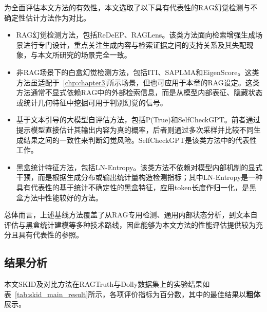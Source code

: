 为全面评估本文方法的有效性，本文选取了以下具有代表性的RAG幻觉检测与不确定性估计方法作为对比。

\begin{itemize}
  \item RAG幻觉检测方法，包括ReDeEP\cite{sun2025redeep}、RAGLens\cite{xiong2025toward}。该类方法面向检索增强生成场景进行专门设计，重点关注生成内容与检索证据之间的支持关系及其失配现象，与本文所研究的场景完全一致。
  \item 非RAG场景下的白盒幻觉检测方法，包括ITI\cite{li2023inference}、SAPLMA\cite{azaria2023internal}和EigenScore\cite{chen2024inside}。这类方法虽适配于~\ref{chp:chapter3}所示场景，但也可应用于本章的RAG设定。这类方法通常不显式依赖RAG中的外部检索信息，而是从模型内部表征、隐藏状态或统计几何特征中挖掘可用于判别幻觉的信号。
  \item 基于文本引导的大模型自评估方法，包括P(True)\cite{kadavath2022language}和SelfCheckGPT\cite{manakul2023selfcheckgpt}。前者通过提示模型直接估计其输出内容为真的概率，后者则通过多次采样并比较不同生成结果之间的一致性来判断幻觉风险。SelfCheckGPT是该类方法中的代表性工作。
  \item 黑盒统计特征方法，包括LN-Entropy\cite{malinin2021uncertainty}。该类方法不依赖对模型内部机制的显式干预，而是根据生成分布或输出统计量构造检测指标；其中LN-Entropy是一种具有代表性的基于统计不确定性的黑盒特征，应用token长度作归一化，是黑盒方法中性能较好的方法。
\end{itemize}

总体而言，上述基线方法覆盖了从RAG专用检测、通用内部状态分析，到文本自评估与黑盒统计建模等多种技术路线，因此能够为本文方法的性能评估提供较为充分且具有代表性的参照。

\subsection{结果分析}\label{subsec:skid_result_analysis}

本文SKID及对比方法在RAGTruth与Dolly数据集上的实验结果如表~\ref{tab:skid_main_result}所示，各项评价指标为百分数，其中的最佳结果以\textbf{粗体}展示。

